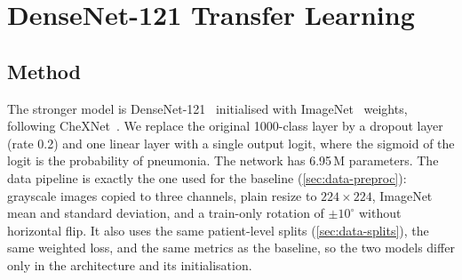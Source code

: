 \section{DenseNet-121 Transfer Learning}
\label{sec:densenet}

\subsection{Method}
\label{sec:densenet-method}
The stronger model is DenseNet-121~\cite{huang2017densenet} initialised with ImageNet~\cite{deng2009imagenet} weights, following CheXNet~\cite{rajpurkar2017chexnet}.
We replace the original 1000-class layer by a dropout layer (rate 0.2) and one linear layer with a single output logit, where the sigmoid of the logit is the probability of pneumonia.
The network has 6.95\,M parameters.
The data pipeline is exactly the one used for the baseline (\cref{sec:data-preproc}): grayscale images copied to three channels, plain resize to $224\times224$,
ImageNet mean and standard deviation, and a train-only rotation of $\pm10^\circ$ without horizontal flip.
It also uses the same patient-level splits (\cref{sec:data-splits}), the same weighted loss, and the same metrics as the baseline, so the two models differ only in the architecture and its initialisation.


